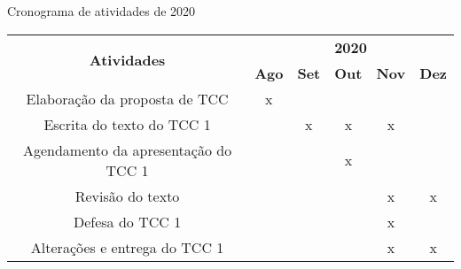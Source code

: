 \begin{quadro}[!ht]
\centering
\caption{\label{qua:cronograma2020}Cronograma de atividades de 2020}

\begin{tabular}{|c|l|l|l|c|l|}
\hline
\multirow{2}{*}{\textbf{Atividades}} & \multicolumn{5}{c|}{\textbf{2020}}                                                                                                                                    \\ \cline{2-6} 
                                     & \multicolumn{1}{c|}{\textbf{Ago}} & \multicolumn{1}{c|}{\textbf{Set}} & \multicolumn{1}{c|}{\textbf{Out}} & \textbf{Nov}          & \multicolumn{1}{c|}{\textbf{Dez}} \\ \hline
Elaboração da proposta de TCC        & \multicolumn{1}{c|}{x}            &                                   &                                   & \multicolumn{1}{l|}{} &                                   \\ \hline
Escrita do texto do TCC 1            &                                   & \multicolumn{1}{c|}{x}            & \multicolumn{1}{c|}{x}            & x                     &                                   \\ \hline
Agendamento da apresentação do TCC 1 &                                   &                                   & \multicolumn{1}{c|}{x}            & \multicolumn{1}{l|}{} &                                   \\ \hline
Revisão do texto                     &                                   &                                   &                                   & x                     & \multicolumn{1}{c|}{x}            \\ \hline
Defesa do TCC 1                      &                                   &                                   &                                   & x                     &                                   \\ \hline
Alterações e entrega do TCC 1        &                                   &                                   &                                   & x                     & \multicolumn{1}{c|}{x}            \\ \hline
\end{tabular}

\end{quadro}


